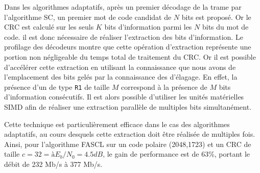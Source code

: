 Dans les algorithmes adaptatifs, après un premier décodage de la trame par l'algorithme SC, un premier mot de code candidat de $N$ bits est proposé. Or le CRC est calculé sur les seuls $K$ bits d'information parmi les $N$ bits du mot de code. il est donc nécessaire de réaliser l'extraction des bits d'information. Le profilage des décodeurs montre que cette opération d'extraction représente une portion non négligeable du temps total de traitement du CRC. Or il est possible d'accélérer cette extraction en utilisant la connaissance que nous avons de l'emplacement des bits gelés par la connaissance des \noeuds d'élagage. En effet, la présence d'un \noeud de type \texttt{R1} de taille $M$ correspond à la présence de $M$ bits d'information consécutifs. Il est alors possible d'utiliser les unités matérielles SIMD afin de réaliser une extraction parallèle de multiples bits simultanément.

Cette technique est particulièrement efficace dans le cas des algorithmes adaptatifs, au cours desquels cette extraction doit être réalisée de multiples fois. Ainsi, pour l'algorithme FASCL sur un code polaire (2048,1723) et un CRC de taille $c=32= à E_b/N_0 = 4.5dB$, le gain de performance est de 63\%, portant le débit de 232 Mb/s à 377 Mb/s.

